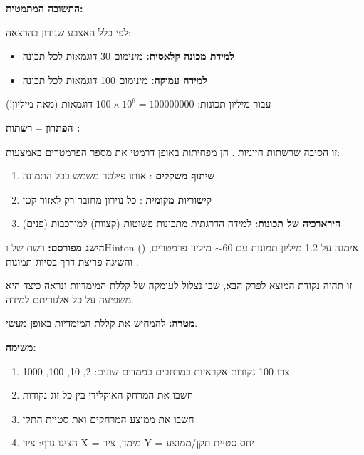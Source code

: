 \textbf{התשובה המתמטית:}

לפי כלל האצבע שנידון בהרצאה:
\begin{itemize}
\item \textbf{למידת מכונה קלאסית:} מינימום \num{30} דוגמאות לכל תכונה
\item \textbf{למידה עמוקה:} מינימום \num{100} דוגמאות לכל תכונה
\end{itemize}

עבור מיליון תכונות: $\num{100} \times \num{10}^6 = \num{100000000}$ דוגמאות (מאה מיליון!)

\textbf{הפתרון – רשתות :}

זו הסיבה שרשתות  חיוניות \cite{lecun1998, krizhevsky2012}. הן מפחיתות באופן דרמטי את מספר הפרמטרים באמצעות:

\begin{enumerate}
\item \textbf{שיתוף משקלים} : אותו פילטר משמש בכל התמונה
\item \textbf{קישוריות מקומית} : כל נוירון מחובר רק לאזור קטן
\item \textbf{הירארכיה של תכונות:} למידה הדרגתית מתכונות פשוטות (קצוות) למורכבות (פנים)
\end{enumerate}

\textbf{הישג מפורסם:} רשת  של  ו\en{-}Hinton () אימנה על \num{1.2} מיליון תמונות עם $\sim\num{60}$ מיליון פרמטרים, והשיגה פריצת דרך בסיווג תמונות \cite{krizhevsky2012}.

זו תהיה נקודת המוצא לפרק הבא, שבו נצלול לעומקה של קללת המימדיות ונראה כיצד היא משפיעה על כל אלגוריתם למידה.


\textbf{מטרה:} להמחיש את קללת המימדיות באופן מעשי.

\textbf{משימה:}

\begin{enumerate}
\item צרו \num{100} נקודות אקראיות במרחבים בממדים שונים: \num{2}, \num{10}, \num{100}, \num{1000}
\item חשבו את המרחק האוקלידי בין כל זוג נקודות
\item חשבו את ממוצע המרחקים ואת סטיית התקן
\item הציגו גרף: ציר X = מימד, ציר Y = יחס סטיית תקן/ממוצע
\end{enumerate}

